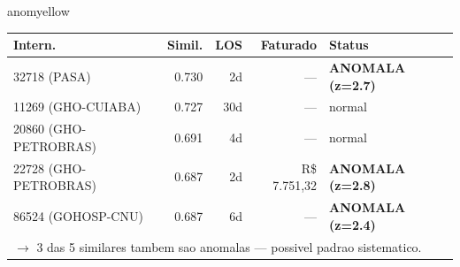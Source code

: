 \documentclass[a4paper,10pt]{article}
\begin{document}
\begin{anomalycard}[Internacao 116895 | GHO-BRADESCO | MODERADO (z=2.30)]{anomyellow}
\begin{tabular}{l r r r l}\toprule\textbf{Intern.} & \textbf{Simil.} & \textbf{LOS} & \textbf{Faturado} & \textbf{Status} \\\midrule
32718 (PASA) & 0.730 & 2d & --- & \textcolor{anomred}{\textbf{ANOMALA (z=2.7)}} \\
11269 (GHO-CUIABA) & 0.727 & 30d & --- & \textcolor{jcubeblue}{normal} \\
20860 (GHO-PETROBRAS) & 0.691 & 4d & --- & \textcolor{jcubeblue}{normal} \\
22728 (GHO-PETROBRAS) & 0.687 & 2d & R\$ 7.751,32 & \textcolor{anomred}{\textbf{ANOMALA (z=2.8)}} \\
86524 (GOHOSP-CNU) & 0.687 & 6d & --- & \textcolor{anomred}{\textbf{ANOMALA (z=2.4)}} \\
\multicolumn{5}{l}{\textcolor{anomred}{\small $\rightarrow$ 3 das 5 similares tambem sao anomalas --- possivel padrao sistematico.}} \\
\bottomrule\end{tabular}


\end{anomalycard}

\newpage
\end{document}
